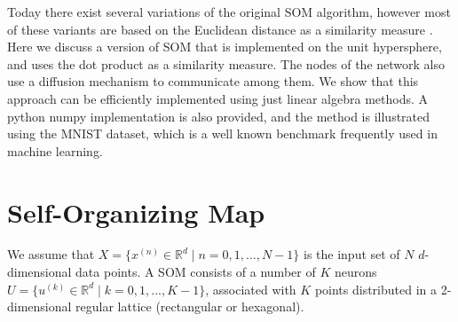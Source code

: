\documentclass[10pt,english]{article}
\begin{document}
Today there exist several variations of the original SOM algorithm, however most of these variants are based 
on the Euclidean distance as a similarity measure \cite{key-5}. Here we discuss a version of SOM that is implemented on the unit hypersphere, and uses the dot product as a similarity measure. The nodes of the network also use a diffusion 
mechanism to communicate among them. We show that this approach can be efficiently implemented using just linear algebra methods. A python numpy implementation is also 
provided, and the method is illustrated using the MNIST dataset, which is a well known benchmark frequently used in machine learning.

\section{Self-Organizing Map}

We assume that $X=\{x^{(n)} \in \mathbb{R}^d \mid  n=0,1,...,N-1 \}$ is the input set of $N$ $d$-dimensional data points. 
A SOM consists of a number of $K$ neurons $U=\{ u^{(k)} \in \mathbb{R}^d \mid  k=0,1,...,K-1 \}$, associated with $K$ points distributed in a 2-dimensional regular lattice (rectangular or hexagonal). 
\end{document}
